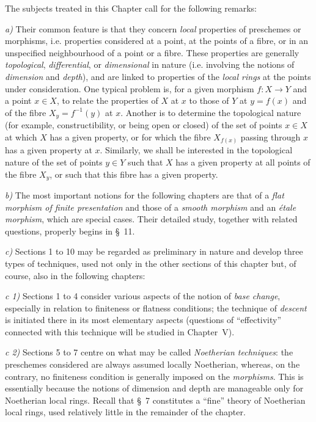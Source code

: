 \clearpage
\leavevmode{}

The subjects treated in this Chapter call for the following remarks:

\medskip
\noindent
\emph{a)} Their common feature is that they concern \emph{local} properties
of preschemes or morphisms, i.e. properties considered at a point, at the
points of a fibre, or in an unspecified neighbourhood of a point or a fibre.
These properties are generally \emph{topological}, \emph{differential}, or
\emph{dimensional} in nature (i.e. involving the notions of \emph{dimension}
and \emph{depth}), and are linked to properties of the \emph{local rings} at
the points under consideration. One typical problem is, for a given morphism
$f:X\to Y$ and a point $x\in X$, to relate the properties of $X$ at $x$ to
those of $Y$ at $y=f(x)$ and of the fibre $X_y=f^{-1}(y)$ at $x$. Another is
to determine the topological nature (for example, constructibility, or being
open or closed) of the set of points $x\in X$ at which $X$ has a given
property, or for which the fibre $X_{f(x)}$ passing through $x$ has a given
property at $x$. Similarly, we shall be interested in the topological nature
of the set of points $y\in Y$ such that $X$ has a given property at all
points of the fibre $X_y$, or such that this fibre has a given property.

\medskip
\noindent
\emph{b)} The most important notions for the following chapters are that of
a \emph{flat morphism of finite presentation} and those of a \emph{smooth
morphism} and an \emph{étale morphism}, which are special cases. Their
detailed study, together with related questions, properly begins in §~11.

\medskip
\noindent
\emph{c)} Sections 1 to 10 may be regarded as preliminary in nature and
develop three types of techniques, used not only in the other sections of
this chapter but, of course, also in the following chapters:

\medskip
\noindent
\emph{c 1)} Sections 1 to 4 consider various aspects of the notion of
\emph{base change}, especially in relation to finiteness or flatness
conditions; the technique of \emph{descent} is initiated there in its most
elementary aspects (questions of “effectivity” connected with this
technique will be studied in Chapter~V).

\medskip
\noindent
\emph{c 2)} Sections 5 to 7 centre on what may be called \emph{Noetherian
techniques}: the preschemes considered are always assumed locally Noetherian,
whereas, on the contrary, no finiteness condition is generally imposed on
the \emph{morphisms}. This is essentially because the notions of dimension
and depth are manageable only for Noetherian local rings. Recall that §~7
constitutes a “fine” theory of Noetherian local rings, used relatively
little in the remainder of the chapter.

